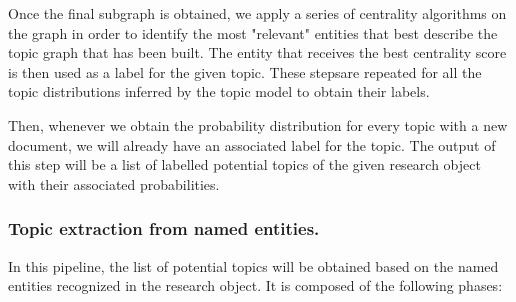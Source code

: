 \documentclass[runningheads]{llncs}
\begin{document}
\begin{itemize}
	Once the final subgraph is obtained, we apply a series of centrality algorithms on the graph in order to identify the most "relevant" entities that best describe the topic graph that has been built. The entity that receives the best centrality score is then used as a label for the given topic. These stepsare repeated for all the topic distributions inferred by the topic model to obtain their labels. 
	
	Then, whenever we obtain the probability distribution for every topic with a new document, we will already have an associated label for the topic. The output of this step will be a list of labelled potential topics of the given research object with their associated probabilities.
\end{itemize}

\subsubsection{Topic extraction from named entities.}
In this pipeline, the list of potential topics will be obtained based on the named entities recognized in the research object. It is composed of the following phases:
\end{document}
